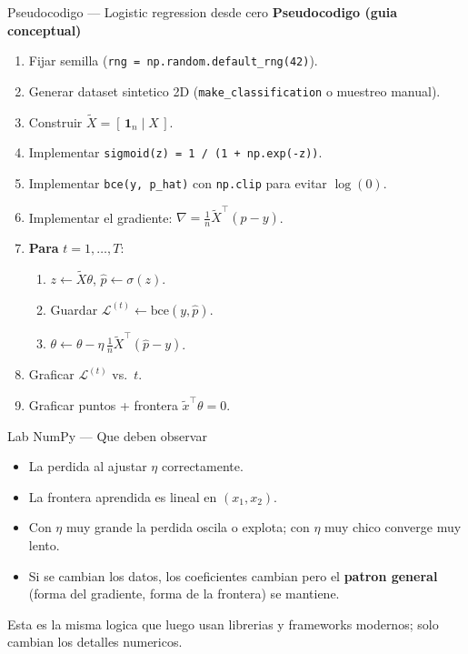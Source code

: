 \begin{frame}{Pseudocodigo — Logistic regression desde cero}
\footnotesize
\textbf{Pseudocodigo (guia conceptual)}
\begin{enumerate}\footnotesize
  \item Fijar semilla (\texttt{rng = np.random.default\_rng(42)}).
  \item Generar dataset sintetico 2D (\texttt{make\_classification} o muestreo manual).
  \item Construir $\tilde X = [\,\mathbf{1}_n \mid X\,]$.
  \item Implementar \texttt{sigmoid(z) = 1 / (1 + np.exp(-z))}.
  \item Implementar \texttt{bce(y, p\_hat)} con \texttt{np.clip} para evitar $\log(0)$.
  \item Implementar el gradiente: $\nabla = \tfrac{1}{n}\tilde X^\top(\hat p - y)$.
  \item \textbf{Para} $t = 1,\dots,T$:
  \begin{enumerate}\scriptsize
    \item $z \leftarrow \tilde X\theta$, $\hat p \leftarrow \sigma(z)$.
    \item Guardar $\mathcal{L}^{(t)} \leftarrow \mathrm{bce}(y,\hat p)$.
    \item $\theta \leftarrow \theta - \eta\,\tfrac{1}{n}\tilde X^\top(\hat p - y)$.
  \end{enumerate}
  \item Graficar $\mathcal{L}^{(t)}$ vs.\ $t$.
  \item Graficar puntos + frontera $\tilde x^\top\theta = 0$.
\end{enumerate}
\end{frame}

\begin{frame}{Lab NumPy — Que deben observar}
\begin{itemize}\small
  \item La perdida  al ajustar $\eta$ correctamente.
  \item La frontera aprendida es lineal en $(x_1, x_2)$.
  \item Con $\eta$ muy grande la perdida oscila o explota; con $\eta$ muy chico converge muy lento.
  \item Si se cambian los datos, los coeficientes cambian pero el \textbf{patron general} (forma del gradiente, forma de la frontera) se mantiene.
\end{itemize}

\vspace{0.3em}
{\footnotesize Esta es la misma logica que luego usan librerias y frameworks modernos; solo cambian los detalles numericos.}
\end{frame}

